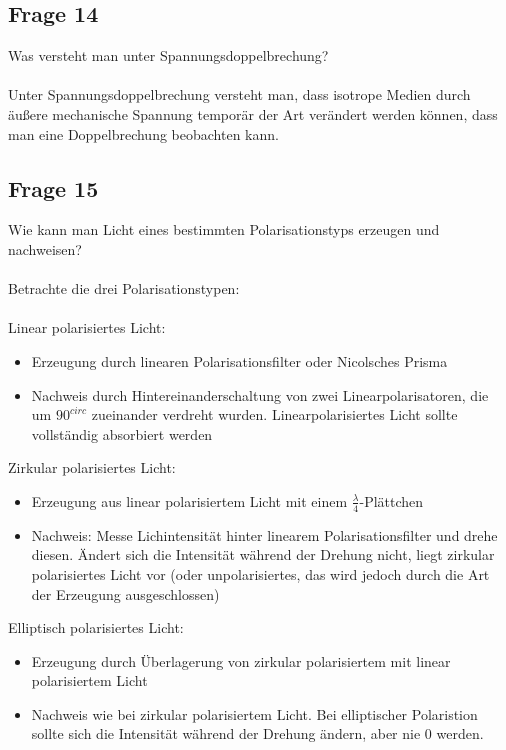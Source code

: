 \documentclass[a4paper,10pt]{scrartcl}
\begin{document}
	    	
	    \subsection{Frage 14}
		    Was versteht man unter Spannungsdoppelbrechung?\\
		    \\
		    Unter Spannungsdoppelbrechung versteht man, dass isotrope Medien durch äußere mechanische Spannung temporär der Art verändert werden können, dass man eine Doppelbrechung beobachten kann.
		    
		\subsection{Frage 15}
			Wie kann man Licht eines bestimmten Polarisationstyps erzeugen und nachweisen?\\
			\\
			Betrachte die drei Polarisationstypen:\\
			\\
			Linear polarisiertes Licht:
			\begin{itemize}
				\item Erzeugung durch linearen Polarisationsfilter oder Nicolsches Prisma
				\item Nachweis durch Hintereinanderschaltung von zwei Linearpolarisatoren, die um \(90^{circ}\) zueinander verdreht wurden. Linearpolarisiertes Licht sollte vollständig absorbiert werden
			\end{itemize}
			
			Zirkular polarisiertes Licht:
			\begin{itemize}
				\item Erzeugung aus linear polarisiertem Licht mit einem \(\frac{\lambda}{4}\)-Plättchen
				\item Nachweis: Messe Lichintensität hinter linearem Polarisationsfilter und drehe diesen. Ändert sich die Intensität während der Drehung nicht, liegt zirkular polarisiertes Licht vor (oder unpolarisiertes, das wird jedoch durch die Art der Erzeugung ausgeschlossen)
			\end{itemize}
			
			Elliptisch polarisiertes Licht:
			\begin{itemize}
				\item Erzeugung durch Überlagerung von zirkular polarisiertem mit linear polarisiertem Licht
				\item Nachweis wie bei zirkular polarisiertem Licht. Bei elliptischer Polaristion sollte sich die Intensität während der Drehung ändern, aber nie 0 werden.
			\end{itemize}
			
	
\end{document}
